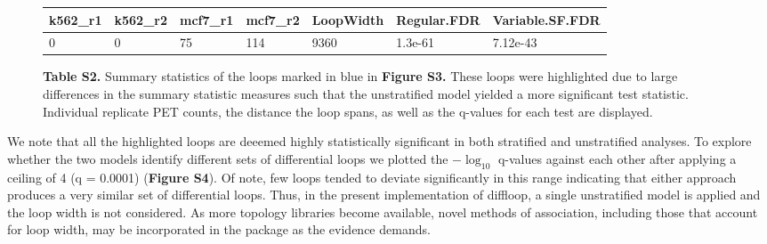 \documentclass{article}\usepackage[]{graphicx}\usepackage[]{color}
\newenvironment{knitrout}{}{} %
\begin{document}
\begin{figure}[h]
\begin{knitrout}
\color{fgcolor}
\begin{tabular}{l|l|l|l|l|l|l}
\hline
k562\_r1 & k562\_r2 & mcf7\_r1 & mcf7\_r2 & LoopWidth & Regular.FDR & Variable.SF.FDR\\
\hline
0 & 0 & 75 & 114 & 9360 & 1.3e-61 & 7.12e-43\\
\hline
\end{tabular}


\end{knitrout}
\centering
\caption{\textbf{Table S2.} Summary statistics of the loops marked in blue in \textbf{Figure S3.} These loops were highlighted due to large differences in the summary statistic measures such that the unstratified model yielded a more significant test statistic. Individual replicate PET counts, the distance the loop spans, as well as the q-values for each test are displayed.}
\end{figure}  \clearpage

We note that all the highlighted loops are deeemed highly statistically significant in both stratified and unstratified analyses. To explore whether the two models identify different sets of differential loops we plotted the $-\log_{10}$ q-values against each other after applying a ceiling of 4 (q = 0.0001) (\textbf{Figure S4}). Of note, few loops tended to deviate significantly in this range indicating that either approach produces a very similar set of differential loops. Thus, in the present implementation of diffloop, a single unstratified model is applied and the loop width is not considered. As more topology libraries become available, novel methods of association, including those that account for loop width, may be incorporated in the package as the evidence demands.  
\end{document}
